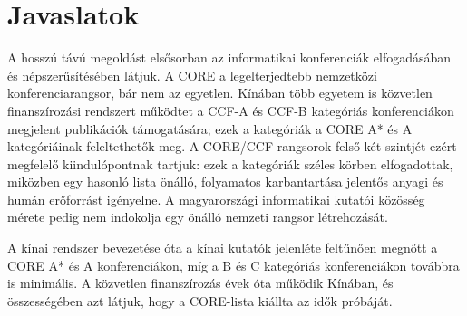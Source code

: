 \documentclass[12pt,a4paper]{article}
\begin{document}
%


\section{Javaslatok}\label{sec:javaslat}

A hosszú távú megoldást elsősorban az informatikai konferenciák elfogadásában és népszerűsítésében látjuk. 
%
A CORE a legelterjedtebb nemzetközi konferenciarangsor, bár nem az egyetlen. Kínában több egyetem is közvetlen finanszírozási rendszert működtet a CCF-A és CCF-B kategóriás konferenciákon megjelent publikációk támogatására; ezek a kategóriák a CORE A\!* és A kategóriáinak feleltethetők meg. A CORE/CCF-rangsorok felső két szintjét ezért megfelelő kiindulópontnak tartjuk: ezek a kategóriák széles körben elfogadottak\cite{li2018impact}, miközben egy hasonló lista önálló, folyamatos karbantartása jelentős anyagi és humán erőforrást igényelne. A magyarországi informatikai kutatói közösség mérete pedig nem indokolja egy önálló nemzeti rangsor létrehozását.


A kínai rendszer bevezetése óta a kínai kutatók jelenléte feltűnően megnőtt a CORE A\!* és A konferenciákon, míg a B és C kategóriás konferenciákon továbbra is minimális. A közvetlen finanszírozás évek óta működik Kínában, és összességében azt látjuk, hogy a CORE-lista kiállta az idők próbáját. 
\end{document}

